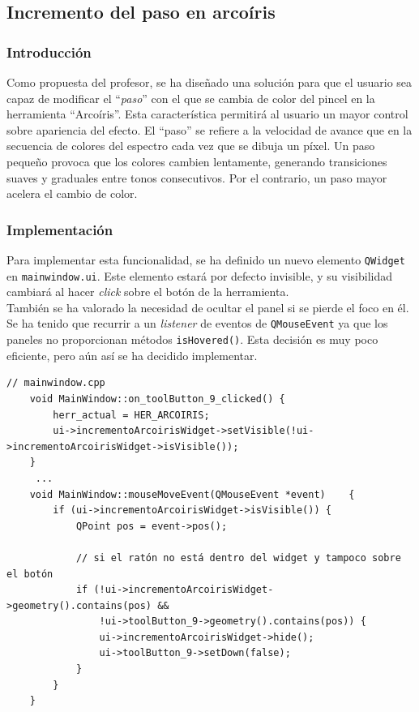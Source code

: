 \documentclass[11pt]{article}
\begin{document}
  \subsection{Incremento del paso en arcoíris}

      \subsubsection{Introducción}

          \noindent
          Como propuesta del profesor, se ha diseñado una solución para que el usuario
          sea capaz de modificar el ``\textit{paso}'' con el que se cambia de color del
          pincel en la herramienta ``Arcoíris''. Esta característica permitirá al usuario
          un mayor control sobre apariencia del efecto. El ``paso'' se refiere a la
          velocidad de avance que en la secuencia de colores del espectro cada vez que se
          dibuja un píxel. Un paso pequeño provoca que los colores cambien lentamente,
          generando transiciones suaves y graduales entre tonos consecutivos. Por el
          contrario, un paso mayor acelera el cambio de color.

      \subsubsection{Implementación}

          Para implementar esta funcionalidad, se ha definido un nuevo elemento
          \texttt{QWidget} en \texttt{mainwindow.ui}. Este elemento estará por defecto
          invisible, y su visibilidad cambiará al hacer \textit{click} sobre el botón de
          la herramienta. \\

          También se ha valorado la necesidad de ocultar el panel si se pierde el foco en
          él. Se ha tenido que recurrir a un \textit{listener} de eventos de
          \texttt{QMouseEvent} ya que los paneles no proporcionan métodos
          \texttt{isHovered()}. Esta decisión es muy poco eficiente, pero aún así se ha
          decidido implementar.

          \begin{lstlisting}[style=CppQtStyle, caption={Mostrar/Ocultar panel al presionar la herramienta}]
    // mainwindow.cpp
    void MainWindow::on_toolButton_9_clicked() {
        herr_actual = HER_ARCOIRIS;
        ui->incrementoArcoirisWidget->setVisible(!ui->incrementoArcoirisWidget->isVisible());
    }
     ...
    void MainWindow::mouseMoveEvent(QMouseEvent *event)    {
        if (ui->incrementoArcoirisWidget->isVisible()) {
            QPoint pos = event->pos();

            // si el ratón no está dentro del widget y tampoco sobre el botón
            if (!ui->incrementoArcoirisWidget->geometry().contains(pos) &&
                !ui->toolButton_9->geometry().contains(pos)) {
                ui->incrementoArcoirisWidget->hide();
                ui->toolButton_9->setDown(false);
            }
        }
    }
\end{lstlisting}
\end{document}
